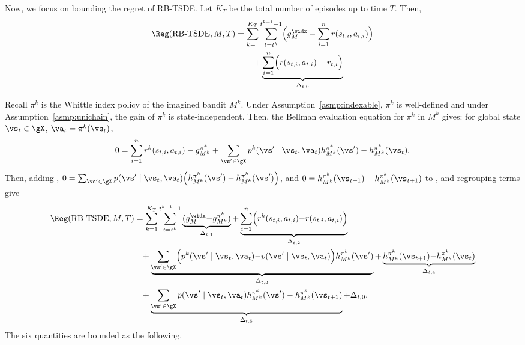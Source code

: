 Now, we focus on bounding the regret of RB-TSDE.
Let $K_T$ be the total number of episodes up to time $T$.
Then,
\begin{align}
    \Reg(\textnormal{RB-TSDE},M,T) 
    &= \sum_{k=1}^{K_T}\sum_{t=t^k}^{t^{k+1}-1} \Bigl(g^\widx_M -\sum_{i=1}^{n}r(s_{t,i},a_{t,i})\Bigr) \label{ch:restless:eq:regret1}\\
    &\qquad +\underbrace{\sum_{i=1}^{n}\Bigl(r(s_{t,i},a_{t,i})-r_{t,i}\Bigr)}_{\Delta_{t,0}} \nonumber
\end{align}

Recall $\pi^k$ is the Whittle index policy of the imagined bandit $M^k$.
Under Assumption~\ref{asmp:indexable}, $\pi^k$ is well-defined and under Assumption~\ref{asmp:unichain}, the gain of $\pi^k$ is state-independent.
Then, the Bellman evaluation equation for $\pi^k$ in $M^k$ gives: for global state $\vs_t\in\gX$, $\va_t=\pi^k(\vs_t)$,
\begin{equation}
    \label{eq:be_imagined}
    0 =  \sum_{i=1}^nr^k(s_{t,i}, a_{t,i}) -g^{\pi^k}_{M^k} +\sum_{\vs'\in\gX}p^k(\vs' \mid \vs_t, \va_t)h^{\pi^k}_{M^k}(\vs') -h^{\pi^k}_{M^k}(\vs_t).
\end{equation}
Then, adding , $0=\sum_{\vs'\in\gX}p(\vs' \mid \vs_t, \va_t)\Bigl(h^{\pi^k}_{M^k}(\vs')-h^{\pi^k}_{M^k}(\vs')\Bigr)$, and $0=h^{\pi^k}_{M^k}(\vs_{t+1})-h^{\pi^k}_{M^k}(\vs_{t+1})$ to , and regrouping terms give
\begin{align*}
    \Reg(\textnormal{RB-TSDE},M,T)
    &=\sum_{k=1}^{K_T}\sum_{t=t^k}^{t^{k+1}-1} \underbrace{(g^\widx_M{-}g^{\pi^k}_{M^k})}_{\Delta_{t,1}} {+}\underbrace{\sum_{i=1}^n\Bigl(r^k(s_{t,i},a_{t,i}){-}r(s_{t,i},a_{t,i})\Bigr)}_{\Delta_{t,2}} \\
    &\quad {+}\underbrace{\sum_{\vs'\in\gX}\Bigl(p^k(\vs' \mid \vs_t, \va_t){-}p(\vs' \mid \vs_t, \va_t)\Bigr)h^{\pi^k}_{M^k}(\vs')}_{\Delta_{t,3}} {+}\underbrace{h^{\pi^k}_{M^k}(\vs_{t+1}){-}h^{\pi^k}_{M^k}(\vs_{t})}_{\Delta_{t,4}} \\
    &\quad {+}\underbrace{\sum_{\vs'\in\gX} p(\vs' \mid \vs_t, \va_t)h^{\pi^k}_{M^k}(\vs')-h^{\pi^k}_{M^k}(\vs_{t+1})}_{\Delta_{t,5}} +\Delta_{t,0}.
\end{align*}
The six quantities are bounded as the following. %

